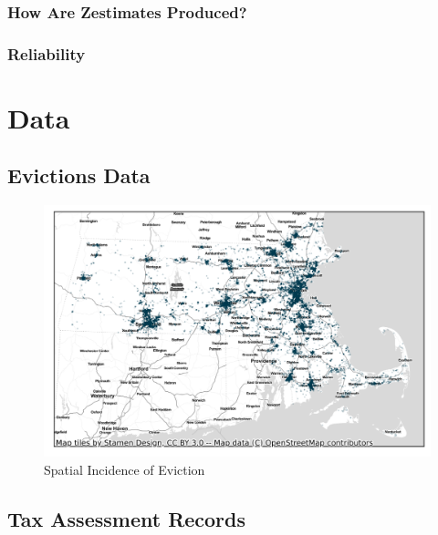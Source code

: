 \documentclass[12pt]{article}
\begin{document}
        \subsubsection{How Are Zestimates Produced?}
        \subsubsection{Reliability}
\section{Data} \label{sec:data}
    \begin{landscape}
    \subsection{Evictions Data}
        \begin{figure}[H]
            \centering
            \includegraphics{output/summary_statistics/figures/evictions_map.png}
            \caption{Spatial Incidence of Eviction}
            \label{fig:my_label}
        \end{figure}
    \end{landscape}
    \subsection{Tax Assessment Records}
\end{document}
